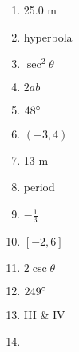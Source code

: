 \documentclass[../uilmath.tex]{subfiles}
\begin{document}
\begin{enumerate}[label=\bfseries\arabic*.]
    \item %
    25.0 m 

    \item %
    hyperbola 

    \item %
    $\sec^2 \theta$

    \item %
    $2ab$

    \item %
    $48\degree$

    \item %
    $(-3,4)$

    \item %
    13 m 

    \item %
    period 

    \item %
    $-\frac{1}{3}$

    \item %
    $[-2,6]$

    \item %
    $2\csc\theta$

    \item %
    $249\degree$

    \item %
    III \& IV

    \item %
    
\end{enumerate}
\end{document}
